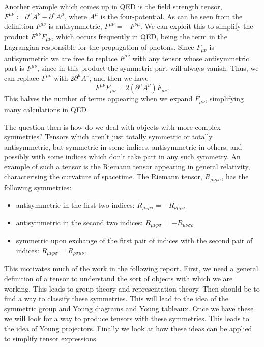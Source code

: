 \documentclass[fleqn]{NotesClass}
\begin{document}
    Another example which comes up in QED is the field strength tensor, \(F^{\mu\nu} \coloneqq \partial^\mu A^\nu - \partial^\nu A^\mu\), where \(A^\mu\) is the four-potential.
    As can be seen from the definition \(F^{\mu\nu}\) is antisymmetric, \(F^{\mu\nu} = -F^{\nu\mu}\).
    We can exploit this to simplify the product \(F^{\mu\nu}F_{\mu\nu}\), which occurs frequently in QED, being the term in the Lagrangian responsible for the propagation of photons.
    Since \(F_{\mu\nu}\) is antisymmetric we are free to replace \(F^{\mu\nu}\) with any tensor whose antisymmetric part is \(F^{\mu\nu}\), since in this product the symmetric part will always vanish.
    Thus, we can replace \(F^{\mu\nu}\) with \(2\partial^\mu A^\nu\), and then we have
    \begin{equation}
        F^{\mu\nu}F_{\mu\nu} = 2(\partial^\mu A^\nu)F_{\mu\nu}.
    \end{equation}
    This halves the number of terms appearing when we expand \(F_{\mu\nu}\), simplifying many calculations in QED.
    
    The question then is how do we deal with objects with more complex symmetries?
    Tensors which aren't just totally symmetric or totally antisymmetric, but symmetric in some indices, antisymmetric in others, and possibly with some indices which don't take part in any such symmetry.
    An example of such a tensor is the Riemann tensor appearing in general relativity, characterising the curvature of spacetime.
    The Riemann tensor, \(R_{\mu\nu\rho\sigma}\), has the following symmetries:
    \begin{itemize}
        \item antisymmetric in the first two indices: \(R_{\mu\nu\rho\sigma} = -R_{\nu\mu\rho\sigma}\)
        \item antisymmetric in the second two indices: \(R_{\mu\nu\rho\sigma} = -R_{\mu\nu\sigma\rho}\)
        \item symmetric upon exchange of the first pair of indices with the second pair of indices: \(R_{\mu\nu\rho\sigma} = R_{\rho\sigma\mu\nu}\).
    \end{itemize}
    
    This motivates much of the work in the following report.
    First, we need a general definition of a tensor to understand the sort of objects with which we are working.
    This leads to group theory and representation theory.
    Then should be to find a way to classify these symmetries.
    This will lead to the idea of the symmetric group and Young diagrams and Young tableaux.
    Once we have these we will look for a way to produce tensors with these symmetries.
    This leads to the idea of Young projectors.
    Finally we look at how these ideas can be applied to simplify tensor expressions.
    
\end{document}
